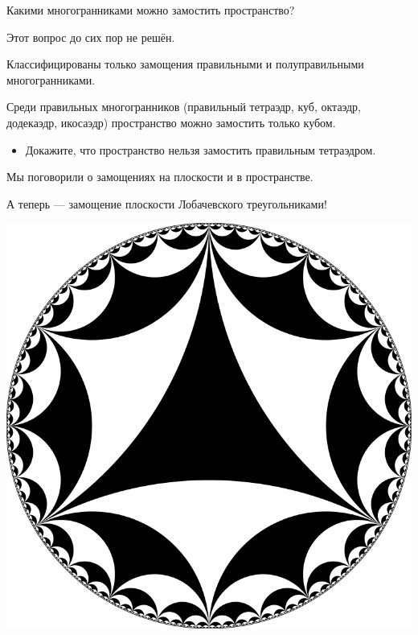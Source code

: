 \documentclass{beamer}
\begin{document}
\begin{frame}

Какими многогранниками можно замостить пространство?

\pause

\bigskip

Этот вопрос до сих пор не решён.

\bigskip

Классифицированы только замощения правильными и полуправильными многогранниками.

\pause

\begin{theorem}
Среди правильных многогранников (правильный тетраэдр, куб, октаэдр, додекаэдр, икосаэдр) пространство можно замостить только кубом.
\end{theorem}


\pause

\begin{itemize}
\item Докажите, что пространство нельзя замостить правильным тетраэдром.
\end{itemize}

\end{frame}


\begin{frame}
Мы поговорили о замощениях на плоскости и в пространстве.

\pause

А теперь --- замощение плоскости Лобачевского треугольниками!

\begin{center}
\includegraphics[width=.65\textwidth]{hyperbolic.png}
\end{center}

\end{frame}


%
%
%
%
%
%
\end{document}
